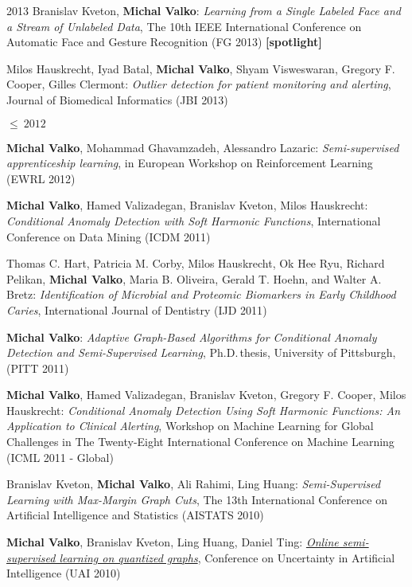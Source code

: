\documentclass{resume}
\begin{document}
\begin{category}{2013}
\citembullet
Branislav Kveton, {\bf Michal Valko}:
\emph{Learning from a Single Labeled Face and a Stream of Unlabeled Data},
The 10th IEEE International Conference on Automatic Face and Gesture Recognition
({\sf FG 2013})
{\bf [spotlight]}

\citembullet
Milos Hauskrecht, Iyad Batal, {\bf Michal Valko}, Shyam Visweswaran,
Gregory F. Cooper, Gilles Clermont: \emph{Outlier detection for patient
monitoring and alerting}, Journal of Biomedical Informatics ({\sf JBI 2013})

\end{category}\begin{category}{$\leq\ 2012$}


\citembullet
{\bf Michal Valko}, Mohammad Ghavamzadeh, Alessandro Lazaric:
\emph{Semi-supervised apprenticeship learning}, in European Workshop on
Reinforcement Learning
({\sf EWRL 2012})


\citembullet
{\bf Michal Valko}, Hamed Valizadegan, Branislav Kveton, Milos Hauskrecht:
\emph{Conditional Anomaly Detection with Soft Harmonic Functions},
International Conference on Data Mining ({\sf ICDM 2011}) 

\citembullet  
Thomas C. Hart, Patricia M. Corby, Milos Hauskrecht, Ok Hee Ryu, Richard Pelikan, {\bf Michal Valko}, Maria B. Oliveira, Gerald T. Hoehn, and Walter A. Bretz: \emph{Identification of Microbial and Proteomic Biomarkers in Early Childhood Caries}, International Journal of Dentistry ({\sf IJD 2011}) 

\citembullet  
{\bf Michal Valko}: 
\emph {Adaptive Graph-Based Algorithms for Conditional Anomaly Detection and Semi-Supervised Learning}, 
Ph.D.\,thesis, University of Pittsburgh, ({\sf PITT 2011}) 

\citembullet
{\bf Michal Valko}, Hamed Valizadegan, Branislav Kveton, Gregory F. Cooper, Milos Hauskrecht:
\emph{Conditional Anomaly Detection Using Soft Harmonic Functions: An Application to Clinical Alerting}, Workshop on Machine Learning for Global Challenges in The Twenty-Eight International Conference on
Machine Learning ({\sf ICML 2011 - Global})

\citembullet
Branislav Kveton, {\bf Michal Valko}, Ali Rahimi, Ling Huang:
\emph{Semi-Supervised Learning with Max-Margin Graph Cuts},
The 13th International Conference on Artificial Intelligence and Statistics
({\sf AISTATS 2010})

\citembullet    
{\bf Michal Valko}, Branislav Kveton, Ling Huang, Daniel Ting: 
\href{http://researchers.lille.inria.fr/~valko/hp/serve.php?what=publications/valko2010online.pdf}
{\emph{Online semi-supervised learning on quantized graphs}},
Conference on Uncertainty in Artificial Intelligence
({\sf UAI 2010})


\end{category}
\end{document}
